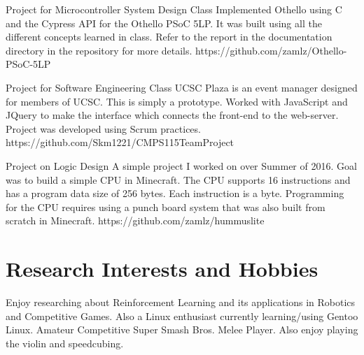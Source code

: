 \documentclass{cv}
\begin{document}
\begin{adjustwidth}{0.5cm}{0.5cm}
{Project for Microcontroller System Design Class}
{Implemented Othello using C and the Cypress API for the Othello PSoC 5LP.
It was built using all the different concepts learned in class. Refer to the
report in the documentation directory in the repository for more details.}
{https://github.com/zamlz/Othello-PSoC-5LP}

{Project for Software Engineering Class}
{UCSC Plaza is an event manager designed for members of UCSC. This is simply
a prototype. Worked with JavaScript and JQuery to make the interface which
connects the front-end to the web-server. Project was developed using Scrum
practices.}
{https://github.com/Skm1221/CMPS115TeamProject}

{Project on Logic Design}
{A simple project I worked on over Summer of 2016. Goal was to build a simple
CPU in Minecraft. The CPU supports 16 instructions and has a program data
size of 256 bytes. Each instruction is a byte. Programming for the CPU
requires using a punch board system that was also built from scratch in
Minecraft.}
{https://github.com/zamlz/hummuslite}
\end{adjustwidth}

\section{Research Interests and Hobbies}
\begin{adjustwidth}{0.5cm}{0.5cm}
Enjoy researching about Reinforcement Learning and its applications
in Robotics and Competitive Games. Also a Linux enthusiast
currently learning/using Gentoo Linux. Amateur Competitive Super Smash
Bros. Melee Player. Also enjoy playing the violin and speedcubing.
\end{adjustwidth}


\end{document}
